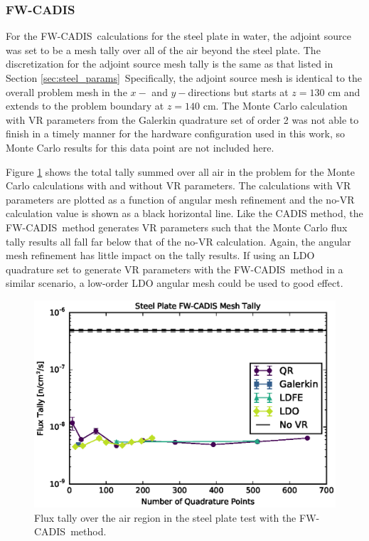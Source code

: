 \documentclass{article} %
\newcommand{\fwc}{\mbox{FW-CADIS}}
\begin{document}
\FloatBarrier
\subsubsection{\fwc}

For the \fwc\ calculations for the steel plate in water, the adjoint source
was set to be a mesh tally over all of the air beyond the steel plate. The
discretization for the adjoint source mesh tally is the same as that listed in
Section \ref{sec:steel_params}\ Specifically, the adjoint source mesh is
identical to the overall problem mesh in the $x-$ and $y-$directions but
starts at $z = 130$ cm and extends to the problem boundary at $z = 140$ cm.
The Monte Carlo calculation with VR parameters from the Galerkin
quadrature set of order 2 was not able to finish in a timely manner for the
hardware configuration used in this work, so Monte Carlo results for this data
point are not included here.

Figure \ref{steel-fwc-tally} shows the total tally summed over all air in the
problem for the Monte Carlo calculations with and without VR parameters. The
calculations with VR parameters are plotted as a function of angular mesh
refinement and the no-VR calculation value is shown as a black horizontal
line. Like the CADIS method, the \fwc\ method generates VR parameters such
that the Monte Carlo flux tally results all fall far below that of
the no-VR calculation. Again, the angular mesh refinement has little impact on
the tally results. If using an LDO quadrature set to generate VR parameters
with the \fwc\ method in a similar scenario, a low-order LDO angular mesh
could be used to good effect.

\begin{figure}[!htb]
\centering
\includegraphics[max height=0.445\textheight]{steel-fwcadis-tally.eps}
\caption{Flux tally over the air region in the steel plate test with the \fwc\ method.}
\label{steel-fwc-tally}
\end{figure}
\end{document}
